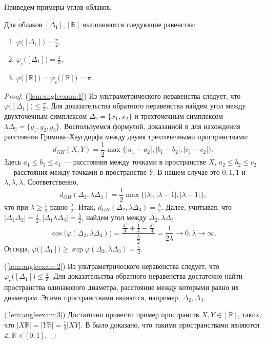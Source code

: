 Приведем примеры углов облаков.
\begin{lemma}
  Для облаков \( [\Delta _{1}], [\mathbb{R}] \) выполняются следующие
  равенства: \label{lem:angleexam}
  \begin{enumerate}
    \item \( \varphi \big([\Delta _{1}]\big) = \frac{\pi }{2}
      \),\label{lem:angleexam:1}
    \item \( \varphi_e \big([\Delta _{1}]\big) = \frac{\pi }{3}
      \),\label{lem:angleexam:2}
    \item \( \varphi \big([\mathbb{R}]\big) = \varphi_e
      \big([\mathbb{R}]\big) = \pi  \).\label{lem:angleexam:3}
  \end{enumerate}
\end{lemma}
\begin{proof}
  (\ref{lem:angleexam:1}) Из ультраметрического неравенства следует, что \(
  \varphi \big([\Delta _1]\big)\le \frac{\pi }{2} \). Для доказательства
  обратного неравенства найдем угол между двухточечным симплексом \( \Delta
  _{2} = \{x_1, x_2\} \) и трехточечным симплексом \(
  \lambda \Delta _3  = \{y_1,y_2, y_3\}\). Воспользуемся формулой, доказанной в
  \cite{ivanov2016} для нахождения расстояния Громова--Хаусдорфа
  между двумя трехточечными пространствами:
  \[
    d_{GH}(X,Y) = \frac{1}{2} \max\big\{ |a_1 - a_2|,|b_1 - b_2|,|c_1
    - c_2|\big\}.
  \]
  Здесь \( a_1 \le b_1 \le c_1 \) --- расстояния между точками в
  пространстве \( X \), \( a_2 \le b_2 \le c_2 \) --- расстояния между
  точками в пространстве \( Y \). В нашем случае это \( 0,1,1 \) и \(
  \lambda , \lambda , \lambda . \) Соответственно,
  \[
    d_{GH}(\Delta_2, \lambda \Delta _{3}) =\frac{1}{2}
    \max\big\{|\lambda |, | \lambda  -1|, |\lambda -1|\big\},
  \]
  что
  при \( \lambda \ge \frac 1 2 \) равно \(\frac \lambda 2 \). Итак, \(d
    _{GH}(\Delta _2, \lambda \Delta _3) =
  \frac{\lambda }{2} \). Далее, учитывая, что \( |\Delta _1
    \Delta _2|=\frac{1}{2}, |\Delta _1 \lambda \Delta
  _3|=\frac{\lambda }{2} \), найдем угол между \( \Delta _2,
  \lambda \Delta _3 \):
  \[ \cos \big(\varphi (\Delta _2 , \lambda \Delta _3)\big)
    =\frac{\frac{\lambda ^2}{4} + \frac{1}{4} - \frac{\lambda
    ^2}{4}}{\frac{\lambda }{2}} = \frac{1}{2 \lambda }
    \rightarrow 0, \lambda \rightarrow \infty.
  \]
  Отсюда, \( \varphi \big([\Delta _1]\big) \ge \sup \varphi (\Delta _2,
  \lambda \Delta _3) = \frac \pi 2. \)

  (\ref{lem:angleexam:2}) Из ультраметрического неравенства следует, что \(
  \varphi_e \big([\Delta _1]\big)\le \frac{\pi }{3} \). Для доказательства
  обратного неравенства достаточно найти пространства одинакового диаметра,
  расстояние между которыми равно их диаметрам. Этими пространствами
  являются, например, \( \Delta _2, \Delta _3 \).

  (\ref{lem:angleexam:3}) Достаточно привести пример пространств \( X,Y\in
  [\mathbb{R}] \), таких, что \( |X \mathbb{R}| = |Y \mathbb{R}| = \frac 1 2
  |XY|. \) В \cite{mikhailovUnreleased} было доказано, что такими
  пространствами являются \( \mathbb{Z}, \mathbb{R}\times
  [0,1] \).

\end{proof}
